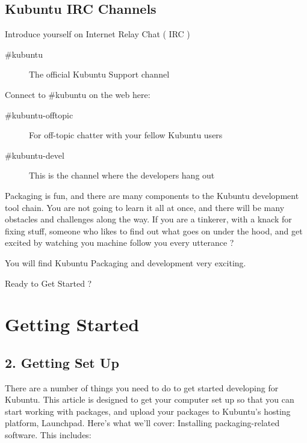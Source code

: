 \documentclass[letterpaper,10pt,english]{sphinxmanual}
\begin{document}
\subsection{Kubuntu IRC Channels}
\label{\detokenize{docs/packaging_guide/welcome:kubuntu-irc-channels}}
Introduce yourself on Internet Relay Chat ( IRC )
\begin{description}
\item[{\#kubuntu}] \leavevmode
The official Kubuntu Support channel

\end{description}

Connect to \#kubuntu on the web here: 
\begin{description}
\item[{\#kubuntu-offtopic}] \leavevmode
For off-topic chatter with your fellow Kubuntu users

\item[{\#kubuntu-devel}] \leavevmode
This is the channel where the developers hang out

\end{description}

Packaging is fun, and there are many components to the Kubuntu development tool chain. You are not going to learn it all at once, and there will be many obstacles and challenges along the way.
If you are a tinkerer, with a knack for fixing stuff, someone who likes to find out what goes on under the hood, and get excited by watching you machine follow you every utterance ?

You will find Kubuntu Packaging and development very exciting.

Ready to Get Started ?


\section{Getting Started}
\label{\detokenize{docs/packaging_guide/getting_started::doc}}\label{\detokenize{docs/packaging_guide/getting_started:getting-started}}

\subsection{2. Getting Set Up}
\label{\detokenize{docs/packaging_guide/getting_started:getting-set-up}}
There are a number of things you need to do to get started developing for Kubuntu. This article is designed to get your computer set up so that you can start working with packages, and upload your packages to Kubuntu’s hosting platform, Launchpad. Here’s what we’ll cover:
Installing packaging-related software. This includes:
\end{document}
